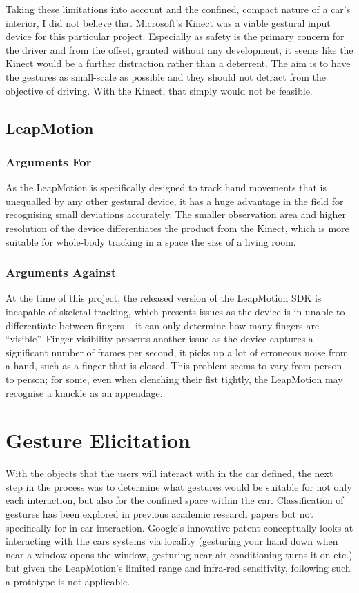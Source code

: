 \documentclass{l4proj}
\begin{document}
Taking these limitations into account and the confined, compact nature of a car’s interior, I did not believe that Microsoft’s Kinect was a viable gestural input device for this particular project. Especially as safety is the primary concern for the driver and from the offset, granted without any development, it seems like the Kinect would be a further distraction rather than a deterrent. The aim is to have the gestures as small-scale as possible and they should not detract from the objective of driving. With the Kinect, that simply would not be feasible.
\subsection{LeapMotion}
\vspace{-3mm}
\subsubsection{Arguments For}
\vspace{-3mm}
As the LeapMotion is specifically designed to track hand movements that is unequalled by any other gestural device, it has a huge advantage in the field for recognising small deviations accurately.   
The smaller observation area and higher resolution of the device differentiates the product from the Kinect, which is more suitable for whole-body tracking in a space the size of a living room.
\subsubsection{Arguments Against}
\vspace{-3mm}
At the time of this project, the released version of the LeapMotion SDK is incapable of skeletal tracking, which presents issues as the device is in unable to differentiate between fingers -- it can only determine how many fingers are ``visible''. Finger visibility presents another issue as the device captures a significant number of frames per second, it picks up a lot of erroneous noise from a hand, such as a finger that is closed. This problem seems to vary from person to person; for some, even when clenching their fist tightly, the LeapMotion may recognise a knuckle as an appendage. 

\section{Gesture Elicitation}
\vspace{-3mm}
With the objects that the users will interact with in the car defined, the next step in the process was to determine what gestures would be suitable for not only each interaction, but also for the confined space within the car. Classification of gestures has been explored in previous academic research papers but not specifically for in-car interaction. Google’s innovative patent conceptually looks at interacting with the cars systems via locality (gesturing your hand down when near a window opens the window, gesturing near air-conditioning turns it on etc.) but given the LeapMotion’s limited range and infra-red sensitivity, following such a prototype is not applicable.
\end{document}
